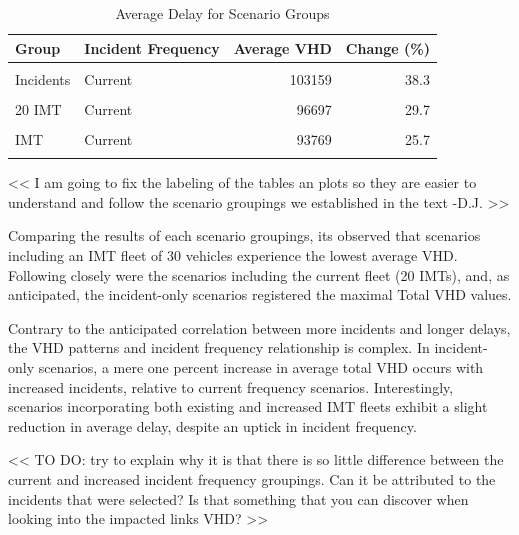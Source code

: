 \documentclass[fancy, oneside, mastersfancy, ms]{byuthesis}
\begin{document}
\hypertarget{tbl-network_delays_table}{}
\begin{table}
\caption{\label{tbl-network_delays_table}Average Delay for Scenario Groups }\tabularnewline

\centering
\begin{tabular}[t]{llrr}
\toprule
\textbf{Group} & \textbf{Incident Frequency} & \textbf{Average VHD} & \textbf{Change (\%)}\\
\midrule
\cellcolor{gray!6}{Baseline} & \cellcolor{gray!6}{-} & \cellcolor{gray!6}{74568} & \cellcolor{gray!6}{0.0}\\
Incidents & Current & 103159 & 38.3\\
\cellcolor{gray!6}{Incidents} & \cellcolor{gray!6}{Increased} & \cellcolor{gray!6}{104178} & \cellcolor{gray!6}{39.7}\\
20 IMT & Current & 96697 & 29.7\\
\cellcolor{gray!6}{20 IMT} & \cellcolor{gray!6}{Increased} & \cellcolor{gray!6}{95678} & \cellcolor{gray!6}{28.3}\\
\addlinespace
30 IMT & Current & 93769 & 25.7\\
\cellcolor{gray!6}{30 IMT} & \cellcolor{gray!6}{Increased} & \cellcolor{gray!6}{93560} & \cellcolor{gray!6}{25.5}\\
\bottomrule
\end{tabular}
\end{table}

\textless\textless{} I am going to fix the labeling of the tables an
plots so they are easier to understand and follow the scenario groupings
we established in the text -D.J. \textgreater\textgreater{}

Comparing the results of each scenario groupings, its observed that
scenarios including an IMT fleet of 30 vehicles experience the lowest
average VHD. Following closely were the scenarios including the current
fleet (20 IMTs), and, as anticipated, the incident-only scenarios
registered the maximal Total VHD values.

Contrary to the anticipated correlation between more incidents and
longer delays, the VHD patterns and incident frequency relationship is
complex. In incident-only scenarios, a mere one percent increase in
average total VHD occurs with increased incidents, relative to current
frequency scenarios. Interestingly, scenarios incorporating both
existing and increased IMT fleets exhibit a slight reduction in average
delay, despite an uptick in incident frequency.

\textless\textless{} TO DO: try to explain why it is that there is so
little difference between the current and increased incident frequency
groupings. Can it be attributed to the incidents that were selected? Is
that something that you can discover when looking into the impacted
links VHD? \textgreater\textgreater{}
\end{document}
